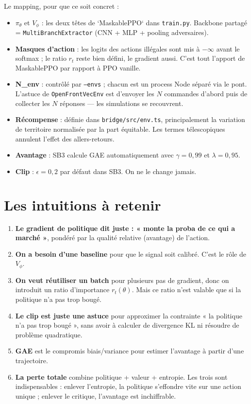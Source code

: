 \documentclass[a4paper,11pt]{article}
\theoremstyle{clean}
\newcommand{\piT}{\pi_{\theta}}
\begin{document}
Le mapping, pour que ce soit concret :
\begin{itemize}[nosep,leftmargin=1.2em]
\item $\piT$ et $V_\phi$ : les deux têtes de `MaskablePPO` dans \texttt{train.py}. Backbone partagé = \texttt{MultiBranchExtractor} (CNN + MLP + pooling adversaires).
\item \textbf{Masques d'action} : les logits des actions illégales sont mis à $-\infty$ avant le softmax ; le ratio $r_t$ reste bien défini, le gradient aussi. C'est tout l'apport de MaskablePPO par rapport à PPO vanille.
\item \textbf{N\_env} : contrôlé par \texttt{--envs} ; chacun est un process Node séparé via le pont. L'astuce de \texttt{OpenFrontVecEnv} est d'envoyer les $N$ commandes d'abord puis de collecter les $N$ réponses --- les simulations se recouvrent.
\item \textbf{Récompense} : définie dans \texttt{bridge/src/env.ts}, principalement la variation de territoire normalisée par la part équitable. Les termes télescopiques annulent l'effet des allers-retours.
\item \textbf{Avantage} : SB3 calcule GAE automatiquement avec $\gamma = 0{,}99$ et $\lambda = 0{,}95$.
\item \textbf{Clip} : $\epsilon = 0{,}2$ par défaut dans SB3. On ne le change jamais.
\end{itemize}

\section{Les intuitions à retenir}

\begin{enumerate}[nosep,leftmargin=1.5em]
\item \textbf{Le gradient de politique dit juste : « monte la proba de ce qui a marché »}, pondéré par la qualité relative (avantage) de l'action.
\item \textbf{On a besoin d'une baseline} pour que le signal soit calibré. C'est le rôle de $V_\phi$.
\item \textbf{On veut réutiliser un batch} pour plusieurs pas de gradient, donc on introduit un ratio d'importance $r_t(\theta)$. Mais ce ratio n'est valable que si la politique n'a pas trop bougé.
\item \textbf{Le clip est juste une astuce} pour approximer la contrainte « la politique n'a pas trop bougé », sans avoir à calculer de divergence KL ni résoudre de problème quadratique.
\item \textbf{GAE} est le compromis biais/variance pour estimer l'avantage à partir d'une trajectoire.
\item \textbf{La perte totale} combine politique + valeur + entropie. Les trois sont indispensables : enlever l'entropie, la politique s'effondre vite sur une action unique ; enlever le critique, l'avantage est inchiffrable.
\end{enumerate}
\end{document}
